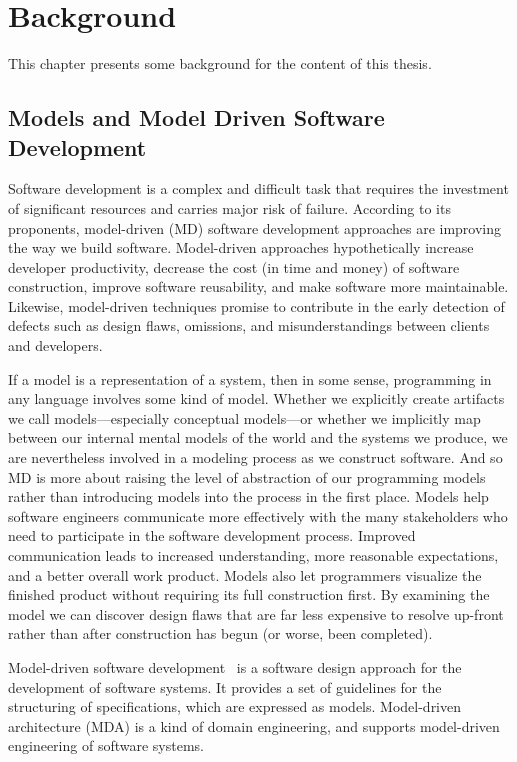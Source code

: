 
\chapter{Background} %

\label{chapter2_bg}
This chapter presents some background for the content of this thesis.

\section{Models and Model Driven Software Development}
\label{mdsd}
Software development is a complex and difficult task that requires the investment of significant resources and carries major risk of failure. According to its proponents, model-driven (MD) software development approaches are improving the way we build software. Model-driven approaches hypothetically increase developer productivity, decrease the cost (in time and money) of software construction, improve software reusability, and make software more maintainable. Likewise, model-driven techniques promise to contribute in the early detection of defects such as design flaws, omissions, and misunderstandings between clients and developers. \par
	If a model is a representation of a system, then in some sense, programming in any language involves some kind of model. Whether we explicitly create artifacts we call models—especially conceptual models—or whether we implicitly map between our internal mental models of the world and the systems we produce, we are nevertheless involved in a modeling process as we construct software. And so MD is more about raising the level of abstraction of our programming models rather than introducing models into the process in the first place. Models  help software engineers communicate more effectively with the many stakeholders who need to participate in the software development process. Improved communication leads to increased understanding, more reasonable expectations, and a better overall work product. Models also let programmers visualize the finished product without requiring its full construction first. By examining the model we can discover design flaws that are far less expensive to resolve up-front rather than after construction has begun (or worse, been completed).\par
	Model-driven software development~\cite{liddle2011model} is a software design approach for the development of software systems. It provides a set of guidelines for the structuring of specifications, which are expressed as models. Model-driven architecture (MDA) is a kind of domain engineering, and supports model-driven engineering of software systems.\par
